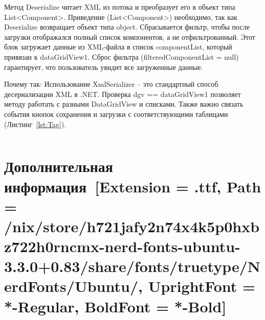 \documentclass[12pt]{article}
\newcommand{\icon}[1]{\fontspec{UbuntuNerdFont}[Extension = .ttf,
  Path = /nix/store/h721jafy2n74x4k5p0hxbz722h0rncmx-nerd-fonts-ubuntu-3.3.0+0.83/share/fonts/truetype/NerdFonts/Ubuntu/,
  UprightFont = *-Regular,
BoldFont = *-Bold] #1}
\newcommand{\iicon}[1]{{\icon{#1}}}
\newcommand{\colorGIT}[1]{\textcolor{CtpLavender}{#1}}
\renewcommand{\texttt}[1]{{\small\ttfamily #1}}
\newenvironment{code}
  {\par\captionsetup{type=listing}\noindent}
  {\par\vspace{\baselineskip}}
\numberwithin{listing}{section}
\numberwithin{figure}{section}
\begin{document}
Метод \texttt{Deserialize} читает \texttt{XML} из потока и преобразует его в объект типа \texttt{List<Component>}.
Приведение \texttt{(List<Component>)} необходимо, так как \texttt{Deserialize} возвращает объект типа \texttt{object}. Сбрасывается фильтр, чтобы после загрузки отображался полный список компонентов, а не отфильтрованный. Этот блок загружает данные из \texttt{XML}-файла в список \texttt{componentList}, который привязан к \texttt{dataGridView1}. Сброс фильтра (\texttt{filteredComponentList = null}) гарантирует, что пользователь увидит все загруженные данные.

Почему так: Использование \texttt{XmlSerializer} -- это стандартный способ десериализации \texttt{XML} в \texttt{.NET}. Проверка \texttt{dgv == dataGridView1} позволяет методу работать с разными \texttt{DataGridView} и списками.
Также важно связать события кнопок сохранения и загрузки с соответствующими таблицами (Листинг~\ref{lst:Tag}).

\begin{code}
	\inputminted[firstline = 146, lastline = 163]{csharp}{../2lab/WinFormsApp1example_/Form1.cs}
	\caption{Связь событий и кнопок с помощью \colorGIT{\href{https://github.com/WebMasterIT/Csharp_Labs/blob/c79e983c4cab3c416e44b6d5f9854b292fdeae26/2lab/WinFormsApp1example_/Form1.cs\#L146-L163}{\texttt{Tag}}}}
	\label{lst:Tag}
\end{code}

\newpage

\section{Дополнительная информация~\texorpdfstring{\iicon{}}{}}
\end{document}
